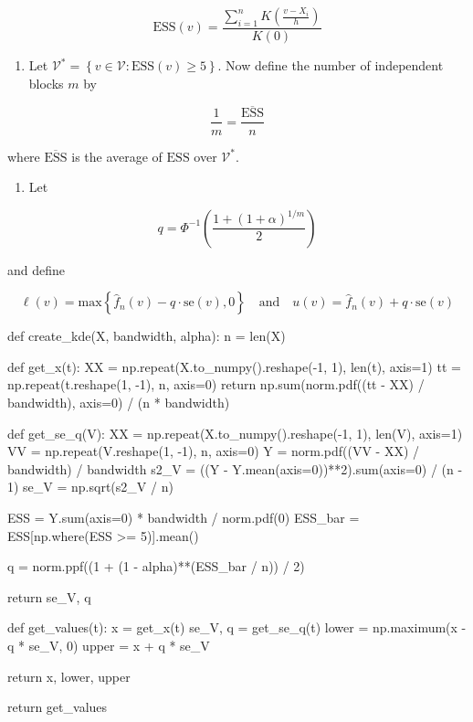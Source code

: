 \[ \text{ESS}(v) = \frac{\sum_{i=1}^{n} K\left( \frac{v - X_{i}}{h} \right)}{K(0)} \]

\begin{enumerate}[tightlist,label={\arabic*.},resume]
\item
  Let
  \(\mathcal{V}^* = \left\{ v \in \mathcal{V} : \text{ESS}(v) \geq 5 \right\}\).
  Now define the number of independent blocks \(m\) by
\end{enumerate}

\[ \frac{1}{m} = \frac{\overline{\text{ESS}}}{n} \]

where \(\overline{\text{ESS}}\) is the average of \(\text{ESS}\) over
\(\mathcal{V}^*\).

\begin{enumerate}[tightlist,label={\arabic*.},resume]
\item
  Let
\end{enumerate}

\[ q = \Phi^{-1} \left( \frac{1 + (1 + \alpha)^{1/m}}{2} \right) \]

and define

\[ \ell(v) = \text{max} \left\{ \hat{f}_{n}(v) - q \cdot \text{se}(v), 0 \right\}
\quad \text{and} \quad
u(v) = \hat{f}_{n}(v) + q \cdot \text{se}(v)\]

\begin{python}
def create_{k}de(X, bandwidth, alpha):
    n = len(X)
    
    def get_x(t):
        XX = np.repeat(X.to_{n}umpy().reshape(-1, 1), len(t), axis=1)
        tt = np.repeat(t.reshape(1, -1), n, axis=0)
        return np.sum(norm.pdf((tt - XX) / bandwidth), axis=0) / (n * bandwidth)
    
    def get_se_q(V):
        XX = np.repeat(X.to_{n}umpy().reshape(-1, 1), len(V), axis=1)
        VV = np.repeat(V.reshape(1, -1), n, axis=0)
        Y = norm.pdf((VV - XX) / bandwidth) / bandwidth
        s2_V = ((Y - Y.mean(axis=0))**2).sum(axis=0) / (n - 1)
        se_V = np.sqrt(s2_V / n)

        ESS = Y.sum(axis=0) * bandwidth / norm.pdf(0)
        ESS_bar = ESS[np.where(ESS >= 5)].mean()

        q = norm.ppf((1 + (1 - alpha)**(ESS_bar / n)) / 2)
    
        return se_V, q
    
    def get_values(t):
        x = get_x(t)
        se_V, q = get_se_q(t)
        lower = np.maximum(x - q * se_V, 0)
        upper = x + q * se_V
        
        return x, lower, upper
        
    return get_values
\end{python}

